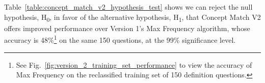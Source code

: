 Table~\ref{table:concept_match_v2_hypothesis_test} shows we can reject the null hypothesis, H\textsubscript{0}, in favor of the alternative hypothesis, H\textsubscript{1}, that Concept Match V2 offers improved performance over Version 1's Max Frequency algorithm, whose accuracy is 48\%\footnote{See Fig.~\ref{fig:version_2_training_set_performance} to view the accuracy of Max Frequency on the reclassified training set of 150 definition questions.} on the same 150 questions, at the 99\% significance level.


\begin{table}[h!]
\centering
\caption{Concept Match V2 vs. Max Frequency Hypothesis Test on Definition Questions}
\small
{}
\label{table:concept_match_v2_hypothesis_test}
\end{table}


